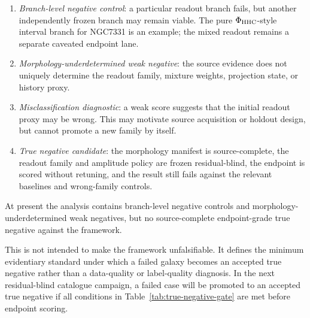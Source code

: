 \documentclass[11pt]{article}
\begin{document}
\begin{enumerate}[leftmargin=*]
\item \emph{Branch-level negative control}: a particular readout branch fails,
but another independently frozen branch may remain viable.  The pure
\(\Phi_{\rm HHC}\)-style interval branch for NGC7331 is an example; the mixed
readout remains a separate caveated endpoint lane.
\item \emph{Morphology-underdetermined weak negative}: the source evidence does
not uniquely determine the readout family, mixture weights, projection state, or
history proxy.
\item \emph{Misclassification diagnostic}: a weak score suggests that the
initial readout proxy may be wrong.  This may motivate source acquisition or
holdout design, but cannot promote a new family by itself.
\item \emph{True negative candidate}: the morphology manifest is source-complete,
the readout family and amplitude policy are frozen residual-blind, the endpoint
is scored without retuning, and the result still fails against the relevant
baselines and wrong-family controls.
\end{enumerate}
At present the analysis contains branch-level negative controls and
morphology-underdetermined weak negatives, but no source-complete endpoint-grade
true negative against the framework.

This is not intended to make the framework unfalsifiable.  It defines the
minimum evidentiary standard under which a failed galaxy becomes an accepted
true negative rather than a data-quality or label-quality diagnosis.  In the
next residual-blind catalogue campaign, a failed case will be promoted to an
accepted true negative if all conditions in Table~\ref{tab:true-negative-gate}
are met before endpoint scoring.
\end{document}
